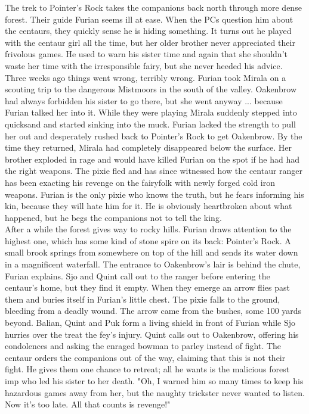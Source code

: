 The trek to Pointer's Rock takes the companions back north through more dense forest. Their guide Furian seems ill at ease. When the PCs question him about the centaurs, they quickly sense he is hiding something. It turns out he played with the centaur girl all the time, but her older brother never appreciated their frivolous games. He used to warn his sister time and again that she shouldn't waste her time with the irresponsible fairy, but she never heeded his advice. Three weeks ago things went wrong, terribly wrong. Furian took Mirala on a scouting trip to the dangerous Mistmoors in the south of the valley. Oakenbrow had always forbidden his sister to go there, but she went anyway ... because Furian talked her into it. While they were playing Mirala suddenly stepped into quicksand and started sinking into the muck. Furian lacked the strength to pull her out and desperately rushed back to Pointer's Rock to get Oakenbrow. By the time they returned, Mirala had completely disappeared below the surface. Her brother exploded in rage and would have killed Furian on the spot if he had had the right weapons. The pixie fled and has since witnessed how the centaur ranger has been exacting his revenge on the fairyfolk with newly forged cold iron weapons. Furian is the only pixie who knows the truth, but he fears informing his kin, because they will hate him for it. He is obviously heartbroken about what happened, but he begs the companions not to tell the king.\\

After a while the forest gives way to rocky hills. Furian draws attention to the highest one, which has some kind of stone spire on its back: Pointer's Rock. A small brook springs from somewhere on top of the hill and sends its water down in a magnificent waterfall. The entrance to Oakenbrow's lair is behind the chute, Furian explains. Sjo and Quint call out to the ranger before entering the centaur's home, but they find it empty. When they emerge an arrow flies past them and buries itself in Furian's little chest. The pixie falls to the ground, bleeding from a deadly wound. The arrow came from the bushes, some 100 yards beyond. Balian, Quint and Puk form a living shield in front of Furian while Sjo hurries over the treat the fey's injury. Quint calls out to Oakenbrow, offering his condolences and asking the enraged bowman to parley instead of fight. The centaur orders the companions out of the way, claiming that this is not their fight. He gives them one chance to retreat; all he wants is the malicious forest imp who led his sister to her death. "Oh, I warned him so many times to keep his hazardous games away from her, but the naughty trickster never wanted to listen. Now it's too late. All that counts is revenge!"\\

